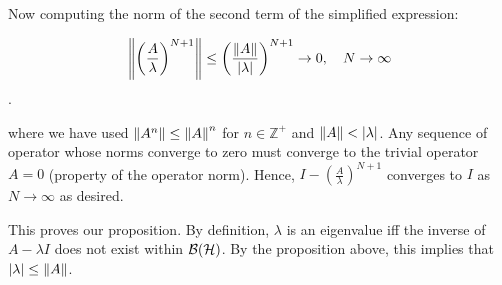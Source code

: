 \documentclass[12pt]{article}%
\begin{document}
\begin{enumerate}[i]
Now computing the norm of the second term of the simplified expression:


\[ \norm{\left(\frac{A}{\lambda}\right)^{N+1}} \leq \left(\frac{\norm{A}}{\abs{\lambda}}\right)^{N+1} \rightarrow 0, \quad N \rightarrow \infty \].

 where we have used $\norm{A^n} \leq \norm{A}^n$ for $n \in \mathbb{Z}^{+}$ and $\norm{A} < \abs{\lambda}$. Any sequence of operator whose norms converge to zero must converge to the trivial operator $A = 0$ (property of the operator norm). Hence, $I - \left(\frac{A}{\lambda}\right)^{N+1}$ converges to $I$ as $N \rightarrow \infty$ as desired.

 This proves our proposition. By definition, $\lambda$ is an eigenvalue iff the inverse of $A - \lambda I$ does not exist within $\mathcal{B}(\mathcal{H})$. By the proposition above, this implies that $\abs{\lambda} \leq \norm{A}$.





\end{enumerate}
\end{document}
